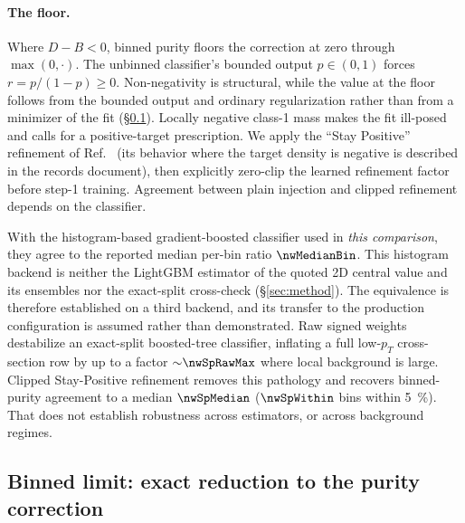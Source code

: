 \paragraph{The floor.} Where $D-B<0$, binned purity floors the correction at zero through $\max(0,\cdot)$. The unbinned classifier's bounded output $p\in(0,1)$ forces $r=p/(1-p)\ge 0$. Non-negativity is structural, while the value at the floor follows from the bounded output and ordinary regularization rather than from a minimizer of the fit (\S\ref{sec:negweight-binned}). Locally negative class-1 mass makes the fit ill-posed and calls for a positive-target prescription. We apply the ``Stay Positive'' refinement of Ref.~\cite{Nachman:2025staypositive} (its behavior where the target density is negative is described in the records document), then explicitly zero-clip the learned refinement factor before step-1 training. Agreement between plain injection and clipped refinement depends on the classifier.

With the histogram-based gradient-boosted classifier used in \emph{this comparison}, they agree to the reported median per-bin ratio $\nwMedianBin$. This histogram backend is neither the LightGBM estimator of the quoted 2D central value and its ensembles nor the exact-split cross-check (\S\ref{sec:method}). The equivalence is therefore established on a third backend, and its transfer to the production configuration is assumed rather than demonstrated. Raw signed weights destabilize an exact-split boosted-tree classifier, inflating a full low-$p_T$ cross-section row by up to a factor ${\sim}\nwSpRawMax$ where local background is large. Clipped Stay-Positive refinement removes this pathology and recovers binned-purity agreement to a median $\nwSpMedian$ ($\nwSpWithin$ bins within \SI{5}{\percent}). That does not establish robustness across estimators, or across background regimes.

\subsection{Binned limit: exact reduction to the purity correction}
\label{sec:negweight-binned}

